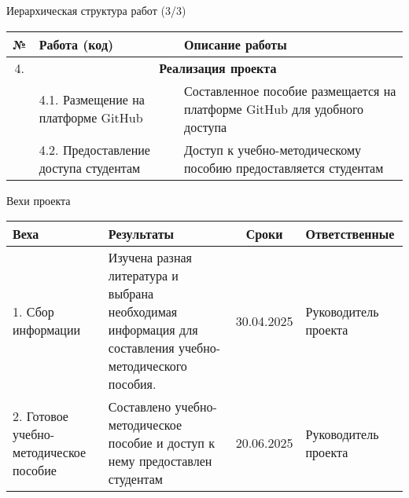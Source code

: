 \documentclass{beamer}
\begin{document}
 \begin{frame}{Иерархическая структура работ (3/3)}
 	\scriptsize
 	\setlength{\tabcolsep}{4pt}
 	\renewcommand{\arraystretch}{1.3}
 	
 	\begin{longtable}{|c|p{4cm}|p{7cm}|}
 		\hline
 		\textbf{№} & \textbf{Работа (код)} & \textbf{Описание работы} \\ \hline
 		4. &\multicolumn{2}{|c|}{ \textbf{Реализация проекта}}  \\ \cline{2-3}
 		& 4.1. Размещение на платформе GitHub & Составленное пособие размещается на платформе GitHub для удобного доступа \\ \cline{2-3}
 		& 4.2. Предоставление доступа студентам & Доступ к учебно-методическому пособию предоставляется студентам \\ \hline
 	\end{longtable}
 \end{frame}
 
 \begin{frame}{Вехи проекта}
 	\footnotesize
 	\setlength{\tabcolsep}{6pt}
 	\renewcommand{\arraystretch}{1.4}
 	
 	\begin{longtable}{|p{2cm}|p{5cm}|c|p{2cm}|}
 		\hline
 		\textbf{Веха} & \textbf{Результаты} & \textbf{Сроки} & \textbf{Ответственные} \\ \hline 		
 		1. Сбор информации & 
 		Изучена разная литература и выбрана необходимая информация для составления учебно-методического пособия. & 
 		30.04.2025 & 
 		Руководитель проекта \\ \hline
 		
 		2. Готовое учебно-методическое пособие & 
 		Составлено учебно-методическое пособие и доступ к нему предоставлен студентам & 
 		20.06.2025 & 
 		Руководитель проекта \\ \hline
 	\end{longtable}
 	
 \end{frame}
 	
\end{document}
